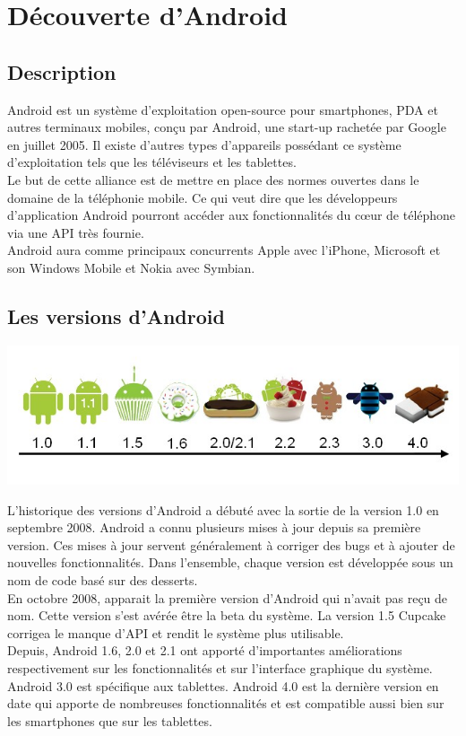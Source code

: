 \documentclass[a4paper]{report}
\begin{document}
	\section{Découverte d’Android}
		\subsection{Description}
			Android est un système d'exploitation open-source pour smartphones, PDA et autres terminaux mobiles, conçu par Android, une start-up rachetée par Google en juillet 2005. Il 				existe d'autres types d'appareils possédant ce système d'exploitation tels que les téléviseurs et les tablettes.\\
			Le but de cette alliance est de mettre en place des normes ouvertes dans le domaine de la téléphonie mobile. Ce qui veut dire que les développeurs d'application Android pourront 				accéder aux fonctionnalités du cœur de téléphone via une API très fournie.\\
			Android aura comme principaux concurrents Apple avec l'iPhone, Microsoft et son Windows	Mobile et Nokia avec Symbian.\\

		\subsection{Les versions d’Android}
			\begin{center}
				\includegraphics[scale=0.7]{Images/versionsandroid.jpg}
			\end{center}
			L'historique des versions d'Android a débuté avec la sortie de la version 1.0 en septembre 2008. Android a connu plusieurs mises à jour depuis sa première version. Ces mises à 			jour servent généralement à corriger des bugs et à ajouter de nouvelles fonctionnalités. Dans l'ensemble, chaque version est développée sous un nom de code basé sur des 				desserts.	\\
			En octobre 2008, apparait la première version d'Android qui n'avait pas reçu de nom. Cette version s'est avérée être la beta du système.
			La version 1.5 Cupcake corrigea le manque d'API et rendit le système plus utilisable.\\
			Depuis, Android 1.6, 2.0 et 2.1 ont apporté d'importantes améliorations respectivement sur les
			fonctionnalités et sur l'interface graphique du système.\\
			Android 3.0 est spécifique aux tablettes. Android 4.0 est la dernière version en date qui apporte de nombreuses fonctionnalités et est compatible aussi bien sur les smartphones 				que sur les tablettes.\\
		
\end{document}
